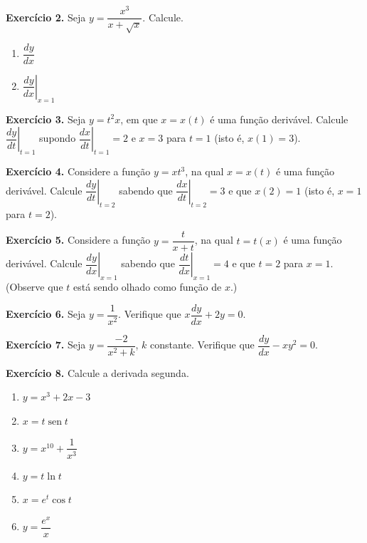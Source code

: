 \documentclass[12pt,a4paper]{article}
\begin{document}
\vspace{0.5cm}
\noindent\textbf{Exercício 2.} Seja $y = \dfrac{x^3}{x + \sqrt{x}}$. Calcule.
\begin{enumerate}
    \renewcommand{\theenumi}{\alph{enumi}}
    \renewcommand{\labelenumi}{\theenumi)}
    \item $\dfrac{dy}{dx}$
    \item $\left.\dfrac{dy}{dx}\right|_{x = 1}$
\end{enumerate}

\vspace{0.5cm}
\noindent\textbf{Exercício 3.}
Seja $y = t^2 x$, em que $x = x(t)$ é uma função derivável. Calcule $\left.\dfrac{dy}{dt}\right|_{t = 1}$ supondo $\left.\dfrac{dx}{dt}\right|_{t = 1} = 2$ e $x = 3$ para $t = 1$ (isto é, $x(1) = 3$).

\vspace{0.5cm}
\noindent\textbf{Exercício 4.}
Considere a função $y = xt^3$, na qual $x = x(t)$ é uma função derivável. Calcule $\left.\dfrac{dy}{dt}\right|_{t = 2}$ sabendo que $\left.\dfrac{dx}{dt}\right|_{t = 2} = 3$ e que $x(2) = 1$ (isto é, $x = 1$ para $t = 2$).

\vspace{0.5cm}
\noindent\textbf{Exercício 5.}
Considere a função $y = \dfrac{t}{x + t}$, na qual $t = t(x)$ é uma função derivável. Calcule $\left.\dfrac{dy}{dx}\right|_{x = 1}$ sabendo que $\left.\dfrac{dt}{dx}\right|_{x = 1} = 4$ e que $t = 2$ para $x = 1$. (Observe que $t$ está sendo olhado como função de $x$.)

\vspace{0.5cm}
\noindent\textbf{Exercício 6.}
Seja $y = \dfrac{1}{x^2}$. Verifique que $x\dfrac{dy}{dx} + 2y = 0$.

\vspace{0.5cm}
\noindent\textbf{Exercício 7.}
Seja $y = \dfrac{-2}{x^2 + k}$, $k$ constante. Verifique que $\dfrac{dy}{dx} - xy^2 = 0$.

\vspace{0.5cm}
\noindent\textbf{Exercício 8.} Calcule a derivada segunda.
\begin{enumerate}
    \renewcommand{\theenumi}{\alph{enumi}}
    \renewcommand{\labelenumi}{\theenumi)}
    \item $y = x^3 + 2x - 3$
    \item $x = t \operatorname{sen} t$
    \item $y = x^{10} + \dfrac{1}{x^3}$
    \item $y = t \ln t$
    \item $x = e^t \cos t$
    \item $y = \dfrac{e^x}{x}$
\end{enumerate}
\end{document}

